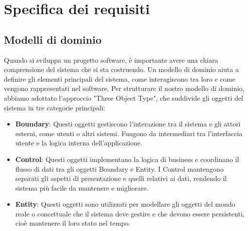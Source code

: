 \chapter{Specifica dei requisiti}

\section{Modelli di dominio}
Quando si sviluppa un progetto software, è importante avere una chiara comprensione del sistema che si sta costruendo. Un modello di dominio aiuta a definire gli elementi principali del sistema, come interagiscono tra loro e come vengono rappresentati nel software.\sskip
Per strutturare il nostro modello di dominio, abbiamo adottato l'approccio "Three Object Type", che suddivide gli oggetti del sistema in tre categorie principali:
\begin{itemize}
	\item \textbf{Boundary}: Questi oggetti gestiscono l'interazione tra il sistema e gli attori esterni, come utenti o altri sistemi. Fungono da intermediari tra l'interfaccia utente e la logica interna dell'applicazione.
	\item \textbf{Control}: Questi oggetti implementano la logica di business e coordinano il flusso di dati tra gli oggetti Boundary e Entity. I Control mantengono separati gli aspetti di presentazione e quelli relativi ai dati, rendendo il sistema più facile da mantenere e migliorare.
	\item \textbf{Entity}: Questi oggetti sono utilizzati per modellare gli oggetti del mondo reale o concettuale che il sistema deve gestire e che devono essere persistenti, cioè mantenere il loro stato nel tempo.
\end{itemize}
\newpage

